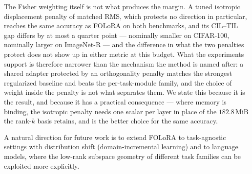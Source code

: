 The Fisher weighting itself is not what produces the margin. A tuned isotropic displacement
penalty of matched RMS, which protects no direction in particular, reaches the same accuracy
as FOLoRA on both benchmarks, and its CIL--TIL gap differs by at most a quarter point ---
nominally smaller on CIFAR-100, nominally larger on ImageNet-R --- and the difference in what
the two penalties protect does not show up in either metric at this budget. What the experiments support is
therefore narrower than the mechanism the method is named after: a shared adapter protected
by an orthogonality penalty matches the strongest regularized baseline and beats the
per-task-module family, and the choice of weight inside the penalty is not what separates
them. We state this because it is the result, and because it has a practical consequence ---
where memory is binding, the isotropic penalty needs one scalar per layer in place of the
$182.8$\,MiB the rank-$k$ basis retains, and is the better choice for the same accuracy.

A natural direction for future work is to extend FOLoRA to task-agnostic settings with
distribution shift (domain-incremental learning) and to language models, where the
low-rank subspace geometry of different task families can be exploited more explicitly.
